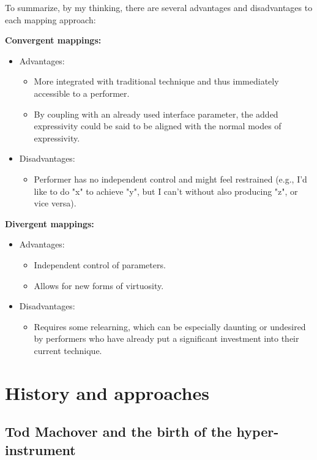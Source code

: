 \documentclass[12pt,twoside,maitrise]{dms_ks}
\theoremstyle{definition}
\begin{document}
To summarize, by my thinking, there are several advantages and disadvantages to each mapping approach:

\textbf{Convergent mappings:}

\begin{itemize}
  \item Advantages:
  \begin{itemize}
    \item More integrated with traditional technique and thus immediately accessible to a performer.
    \item By coupling with an already used interface parameter, the added expressivity could be said to be aligned with the normal modes of expressivity.
  \end{itemize}
  \item Disadvantages:
  \begin{itemize}
    \item Performer has no independent control and might feel restrained (e.g., I'd like to do "x" to achieve "y", but I can't without also producing "z", or vice versa).
  \end{itemize}
\end{itemize}

\textbf{Divergent mappings:}

\begin{itemize}
  \item Advantages:
  \begin{itemize}
    \item Independent control of parameters.
    \item Allows for new forms of virtuosity.
  \end{itemize}
  \item Disadvantages:
  \begin{itemize}
    \item Requires some relearning, which can be especially daunting or undesired by performers who have already put a significant investment into their current technique.
  \end{itemize}
\end{itemize}

\section{History and approaches}

\subsection{Tod Machover and the birth of the hyper-instrument}
\end{document}
